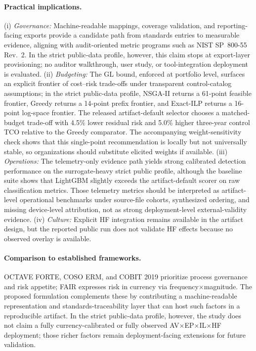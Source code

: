 \documentclass[preprint,12pt]{elsarticle}
\begin{document}
\paragraph{Practical implications.} (i) \emph{Governance:} Machine-readable mappings, coverage validation, and reporting-facing exports provide a candidate path from standards entries to measurable evidence, aligning with audit-oriented metric programs such as NIST SP~800-55 Rev.~2. In the strict public-data profile, however, this claim stops at export-layer provisioning; no auditor walkthrough, user study, or tool-integration deployment is evaluated. (ii) \emph{Budgeting:} The GL bound, enforced at portfolio level, surfaces an explicit frontier of cost--risk trade-offs under transparent control-catalog assumptions; in the strict public-data profile, NSGA-II returns a 61-point feasible frontier, Greedy returns a 14-point prefix frontier, and Exact-ILP returns a 16-point log-space frontier. The released artifact-default selector chooses a matched-budget trade-off with 4.5\% lower residual risk and 5.0\% higher three-year control TCO relative to the Greedy comparator. The accompanying weight-sensitivity check shows that this single-point recommendation is locally but not universally stable, so organizations should substitute elicited weights if available. (iii) \emph{Operations:} The telemetry-only evidence path yields strong calibrated detection performance on the surrogate-heavy strict public profile, although the baseline suite shows that LightGBM slightly exceeds the artifact-default scorer on raw classification metrics. Those telemetry metrics should be interpreted as artifact-level operational benchmarks under source-file cohorts, synthesized ordering, and missing device-level attribution, not as strong deployment-level external-validity evidence. (iv) \emph{Culture:} Explicit HF integration remains available in the artifact design, but the reported public run does not validate HF effects because no observed overlay is available.

\paragraph{Comparison to established frameworks.} OCTAVE FORTE, COSO ERM, and COBIT 2019 prioritize process governance and risk appetite; FAIR expresses risk in currency via frequency$\times$magnitude. The proposed formulation complements these by contributing a machine-readable representation and standards-traceability layer that can host such factors in a reproducible artifact. In the strict public-data profile, however, the study does not claim a fully currency-calibrated or fully observed AV$\times$EP$\times$IL$\times$HF deployment; those richer factors remain deployment-facing extensions for future validation.
\end{document}
